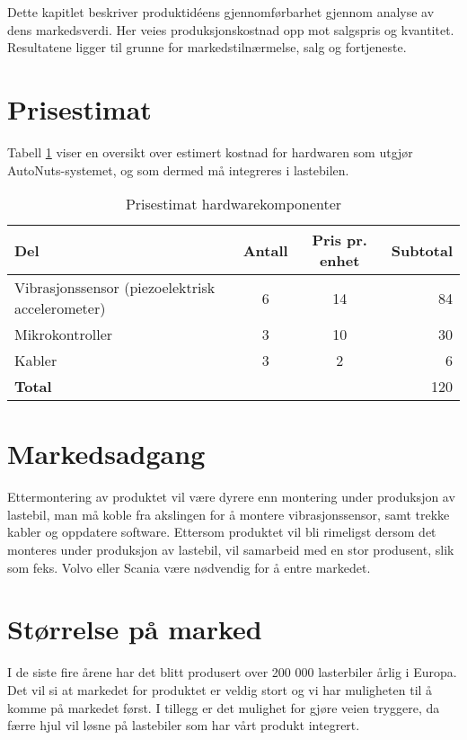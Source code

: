 Dette kapitlet beskriver produktidéens gjennomførbarhet gjennom analyse av 
dens markedsverdi. Her veies produksjonskostnad opp mot salgspris og kvantitet.
Resultatene ligger til grunne for markedstilnærmelse, salg og fortjeneste.

\section{Prisestimat}
Tabell \ref{tab:price-HW} viser en oversikt over estimert kostnad for 
hardwaren som utgjør AutoNuts-systemet, og som dermed må integreres i lastebilen.
\newline
\begin{table}[H]
\caption{Prisestimat hardwarekomponenter}
\label{tab:price-HW}
\begin{tabularx}{\textwidth}{lcc|r}
	{\bf Del} & {\bf Antall} & {\bf Pris pr. enhet} & {\bf Subtotal}\\
	\hline
	Vibrasjonssensor (piezoelektrisk accelerometer) & 6 & 14 & 84\\
	Mikrokontroller & 3 & 10 & 30\\
	Kabler & 3 & 2 & 6\\
	\hline
	\multicolumn{3}{l}{{\bf Total}} &\multicolumn{1}{r}{120}\\
	\hline \hline
\end{tabularx}
\end{table}

\section{Markedsadgang}
Ettermontering av produktet vil være dyrere enn montering under produksjon av 
lastebil, man må koble fra akslingen for å montere vibrasjonssensor, samt 
trekke kabler og oppdatere software. Ettersom produktet vil bli rimeligst 
dersom det monteres under produksjon av lastebil, vil  samarbeid med en stor 
produsent, slik som feks. Volvo eller Scania være nødvendig for å entre markedet. 

\section{Størrelse på marked}
I de siste fire årene har det blitt produsert over 200 000 lasterbiler årlig 
i Europa\cite{lastebilprod-DAF}. Det vil si at markedet for produktet er 
veldig stort og vi har muligheten til å komme på markedet først. I tillegg er 
det mulighet for gjøre veien tryggere, da færre hjul vil løsne på lastebiler 
som har vårt produkt integrert.

